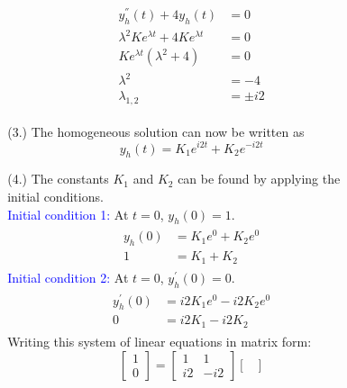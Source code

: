 \documentclass[a4paper, 12pt]{article}
\begin{document}
\begin{itemize}
\begin{itemize}
\begin{itemize}
\begin{itemize}
\begin{equation}
\begin{gathered}
\begin{alignedat}{1}
y_{h}^{''}(t) + 4y_{h}(t) &= 0 \\
\lambda^{2}Ke^{\lambda t} + 4Ke^{\lambda t} &= 0 \\
Ke^{\lambda t} (\lambda^{2} + 4) &= 0 \\
\lambda^{2} &= - 4\\
\lambda_{1, 2} &= \pm i2
\end{alignedat}
\end{gathered}
\end{equation}
\item[(3.)]{The homogeneous solution can now be written as}
\begin{equation}
y_{h}(t) = K_{1}e^{i2 t} + K_{2} e^{-i 2t}
\end{equation}
\item[(4.)]{The constants $K_{1}$ and $K_{2}$ can be found by applying the initial conditions.}\\
\textcolor{blue}{Initial condition 1:} At $t = 0$, $y_{h}(0) = 1$.
\begin{equation}
\begin{gathered}
\begin{alignedat}{1}
y_{h}(0) &= K_{1}e^{0} + K_{2}e^{0} \\
1 &= K_{1} + K_{2}
\end{alignedat}
\end{gathered}
\end{equation} 
\textcolor{blue}{Initial condition 2:} At $t = 0$, $y_{h}^{'}(0) = 0$.
\begin{equation}
\begin{gathered}
\begin{alignedat}{1}
y_{h}^{'}(0) &= i2K_{1}e^{0} - i2 K_{2}e^{0} \\
0 &= i2K_{1} - i2 K_{2}
\end{alignedat}
\end{gathered}
\end{equation} 
Writing this system of linear equations in matrix form:
\begin{equation}
\begin{bmatrix}
1 \\
0
\end{bmatrix} =
\begin{bmatrix}
1 & 1\\
i2 & -i2
\end{bmatrix}
\begin{bmatrix}

\end{bmatrix}
\end{equation}
\end{itemize}
\end{itemize}
\end{itemize}
\end{itemize}
\end{document}
